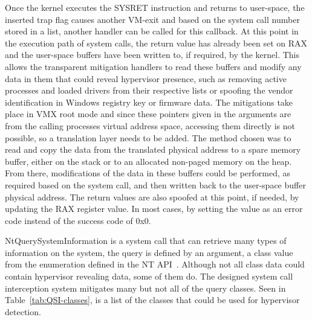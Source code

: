 Once the kernel executes the SYSRET instruction and returns to user-space, the inserted trap flag causes another VM-exit and based on the system call number stored in a list, 
another handler can be called for this callback. At this point in the execution path of system calls, the return value has already been set on RAX and the user-space buffers 
have been written to, if required, by the kernel. This allows the transparent mitigation handlers to read these buffers and modify any data in them 
that could reveal hypervisor presence, such as removing active processes and loaded drivers from their respective lists 
or spoofing the vendor identification in Windows registry key or firmware data.
The mitigations take place in VMX root mode and since these pointers given in the arguments are from the calling processes virtual address space, 
accessing them directly is not possible, so a translation layer needs to be added. The method chosen was to read and copy the data from the translated physical address to a spare memory buffer, 
either on the stack or to an allocated non-paged memory on the heap. From there, modifications of the data in these buffers could be performed, as required based on the system call, 
and then written back to the user-space buffer physical address.
The return values are also spoofed at this point, if needed, by updating the RAX register value. In most cases, by setting the value as an error code instead of the success code of 0x0. 

NtQuerySystemInformation is a system call that can retrieve many types of information on the system, the query is defined by an argument, 
a class value from the  enumeration defined in the NT API~\cite{ntdll-lib}. 
Although not all class data could contain hypervisor revealing data, some of them do. The designed system call interception system mitigates many 
but not all of the query classes. Seen in Table~\ref{tab:QSI-classes}, is a list of the  classes that could be used for hypervisor detection.

